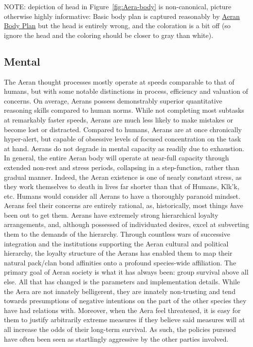 NOTE: depiction of head in Figure~\ref{fig:Aera-body} is non-canonical, picture otherwise highly informative:   Basic body plan is captured reasonably by
\href{http://vegastrike.svn.sourceforge.net/viewvc/vegastrike/trunk/document\%20generation/images/Aera.png?view=markup}{Aeran Body Plan}
but the head is entirely wrong, and the coloration is a bit off (so
ignore the head and the coloring should be closer to gray than white).

\subsection{Mental}

The Aeran thought processes mostly operate at speeds comparable to
that of humans, but with some notable distinctions in process,
efficiency and valuation of concerns. On average, Aerans possess
demonstrably superior quantitative reasoning skills compared to human
norms. While not completing most subtasks at remarkably faster speeds,
Aerans are much less likely to make mistakes or become lost or
distracted. Compared to humans, Aerans are at once chronically
hyper-alert, but capable of obsessive levels of focused concentration
on the task at hand. Aerans do not degrade in mental capacity as
readily due to exhaustion. In general, the entire Aeran body will
operate at near-full capacity through extended non-rest and stress
periods, collapsing in a step-function, rather than gradual
manner. Indeed, the Aeran existence is one of nearly constant stress,
as they work themselves to death in lives far shorter than that of
Humans, Klk'k, etc. Humans would consider all Aerans to have a
thoroughly paranoid mindset. Aerans feel their concerns are entirely
rational, as, historically, most things {\emph have} been out to get
them. Aerans have extremely strong hierarchical loyalty arrangements,
and, although possessed of individuated desires, excel at subverting
them to the demands of the hierarchy. Through countless wars of
successive integration and the institutions supporting the Aeran
cultural and political hierarchy, the loyalty structure of the Aerans
has enabled them to map their natural pack/clan bond affinities onto a
profound species-wide affiliation. The primary goal of Aeran society
is what it has always been: group survival above all else. All that
has changed is the parameters and implementation details. While the
Aera are not innately belligerent, they are innately non-trusting and
tend towards presumptions of negative intentions on the part of the
other species they have had relations with. Moreover, when the Aera
feel threatened, it is easy for them to justify arbitrarily extreme
measures if they believe said measures will at all increase the odds
of their long-term survival. As such, the policies pursued have often
been seen as startlingly aggressive by the other parties involved.

